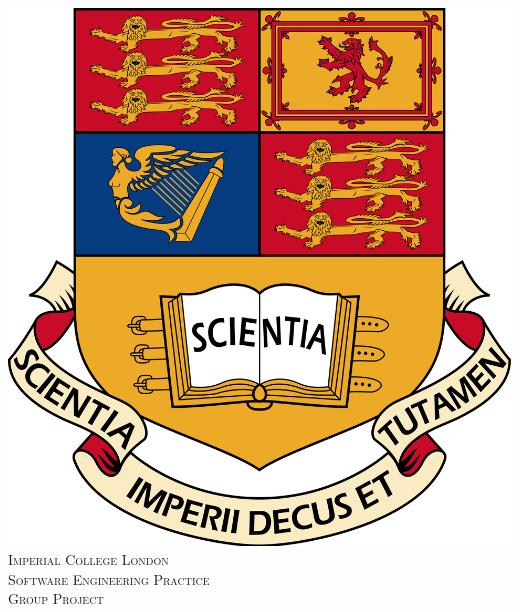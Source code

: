 \documentclass{article}
\begin{document}
\begin{titlepage}

\newcommand{\HRule}{\rule{\linewidth}{0.5mm}} %

\center %
 

\includegraphics[scale=0.05]{logo.png}\\[1cm] 


 

\textsc{\LARGE Imperial College London}\\[1.5cm]
\textsc{\Large Software Engineering Practice\\
Group Project}\\[0.5cm] 


\end{titlepage}
\end{document}
